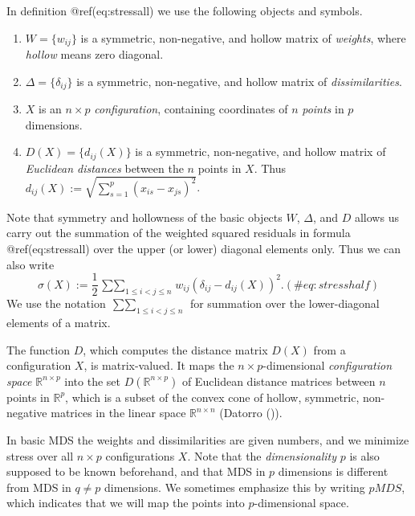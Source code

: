 \documentclass[
  12pt,
  letterpaper,
  DIV=11,
  numbers=noendperiod]{scrartcl}
\providecommand{\tightlist}{%
  \setlength{\itemsep}{0pt}\setlength{\parskip}{0pt}}\usepackage{longtable,booktabs,array}
\begin{document}
In definition @ref(eq:stressall) we use the following objects and
symbols.

\begin{enumerate}
\def\labelenumi{\arabic{enumi}.}
\tightlist
\item
  \(W=\{w_{ij}\}\) is a symmetric, non-negative, and hollow matrix of
  \emph{weights}, where \emph{hollow} means zero diagonal.
\item
  \(\Delta=\{\delta_{ij}\}\) is a symmetric, non-negative, and hollow
  matrix of \emph{dissimilarities}.
\item
  \(X\) is an \(n\times p\) \emph{configuration}, containing coordinates
  of \(n\) \emph{points} in \(p\) dimensions.
\item
  \(D(X)=\{d_{ij}(X)\}\) is a symmetric, non-negative, and hollow matrix
  of \emph{Euclidean distances} between the \(n\) points in \(X\). Thus
  \(d_{ij}(X):=\sqrt{\sum_{s=1}^p(x_{is}-x_{js})^2}\).
\end{enumerate}

Note that symmetry and hollowness of the basic objects \(W\),
\(\Delta\), and \(D\) allows us carry out the summation of the weighted
squared residuals in formula @ref(eq:stressall) over the upper (or
lower) diagonal elements only. Thus we can also write \begin{equation}
\sigma(X):=\frac12\mathop{\sum\sum}_{1\leq i<j\leq n} w_{ij}(\delta_{ij}-d_{ij}(X))^2.
(\#eq:stresshalf)
\end{equation} We use the notation
\(\mathop{\sum\sum}_{1\leq i<j\leq n}\) for summation over the
lower-diagonal elements of a matrix.

The function \(D\), which computes the distance matrix \(D(X)\) from a
configuration \(X\), is matrix-valued. It maps the
\(n\times p\)-dimensional \emph{configuration space}
\(\mathbb{R}^{n\times p}\) into the set \(D(\mathbb{R}^{n\times p})\) of
Euclidean distance matrices between \(n\) points in \(\mathbb{R}^p\),
which is a subset of the convex cone of hollow, symmetric, non-negative
matrices in the linear space \(\mathbb{R}^{n\times n}\) (Datorro
()).

In basic MDS the weights and dissimilarities are given numbers, and we
minimize stress over all \(n\times p\) configurations \(X\). Note that
the \emph{dimensionality} \(p\) is also supposed to be known beforehand,
and that MDS in \(p\) dimensions is different from MDS in \(q\not= p\)
dimensions. We sometimes emphasize this by writing \(pMDS\), which
indicates that we will map the points into \(p\)-dimensional space.
\end{document}
